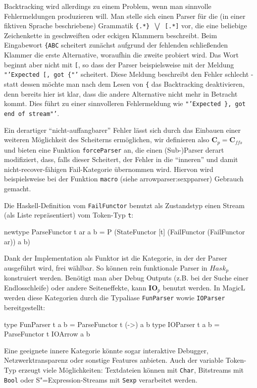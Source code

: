 \documentclass[11pt, a4paper, bibgerm]{scrbook}
\newcommand\icode[1]{\lstinline?#1?}
\newcommand\sref{}
\newcommand{\sees}[1]{(siehe \sref{#1})}
\newcommand{\sexp}{S"=Expression}
\begin{document}
Backtracking wird allerdings zu einem Problem, wenn man sinnvolle
Fehlermeldungen produzieren will. Man stelle sich einen Parser für die
(in einer fiktiven Sprache beschriebene) Grammatik \texttt{\{.*\}
  $\bigvee$ [.*]} vor, die eine beliebige Zeichenkette in geschweiften
oder eckigen Klammern beschreibt. Beim Eingabewort \texttt{\{ABC}
scheitert zunächst aufgrund der fehlenden schließenden Klammer die erste
Alternative, woraufhin die zweite probiert wird. Das Wort beginnt aber
nicht mit \texttt{[}, so dass der Parser beispielsweise mit der Meldung
\texttt{"'Expected [, got \{"'} scheitert. Diese Meldung beschreibt den
Fehler schlecht - statt dessen möchte man nach dem Lesen von \texttt{\{}
das Backtracking deaktivieren, denn bereits hier ist klar, dass die
andere Alternative nicht mehr in Betracht kommt. Dies führt zu einer
sinnvolleren Fehlermeldung wie \texttt{"'Expected \}, got end of
  stream"'}.

Ein derartiger "`nicht-auffangbarer"' Fehler lässt sich durch das
Einbauen einer weiteren Möglichkeit des Scheiterns ermöglichen, wir
definieren also $\mathbf{C}_p = \mathbf{C}_{ffs}$ und bieten eine
Funktion \icode{forceParser} an, die einen (Sub-)Parser derart
modifiziert, dass, falls dieser Scheitert, der Fehler in die "`inneren"'
und damit nicht-recover-fähigen Fail-Kategorie übernommen wird. Hiervon
wird beispielsweise bei der Funktion \icode{macro}
\sees{arrowparser:sexpparser} Gebrauch gemacht.

Die Haskell-Definition vom \icode{FailFunctor} benutzt als Zustandstyp
einen Stream (als Liste repräsentiert) vom Token-Typ \icode{t}:

\begin{code}
newtype ParseFunctor t ar a b =
  P (StateFunctor
     [t]
     (FailFunctor (FailFunctor ar))
     a
     b)
\end{code}

Dank der Implementation als Funktor ist die Kategorie, in der der Parser
ausgeführt wird, frei wählbar. So können rein funktionale Parser in
$Hask_p$ konstruiert werden. Benötigt man aber Debug Outputs (z.B. bei
der Suche einer Endlosschleife) oder andere Seiteneffekte, kann
$\mathbf{IO}_p$ benutzt werden. In MagicL werden diese Kategorien durch
die Typaliase \icode{FunParser} wowie \icode{IOParser} bereitgestellt:
\begin{code}
type FunParser t a b = ParseFunctor t (->) a b
type IOParser  t a b = ParseFunctor t IOArrow a b
\end{code}
Eine geeignete innere Kategorie könnte
sogar interaktive Debugger, Netzwerktransparenz oder sonstige Features
anbieten. Auch der variable Token-Typ erzeugt viele Möglichkeiten:
Textdateien können mit \icode{Char}, Bitstreams mit \icode{Bool} oder
\sexp{}-Streams mit \icode{Sexp} verarbeitet werden.
\end{document}
